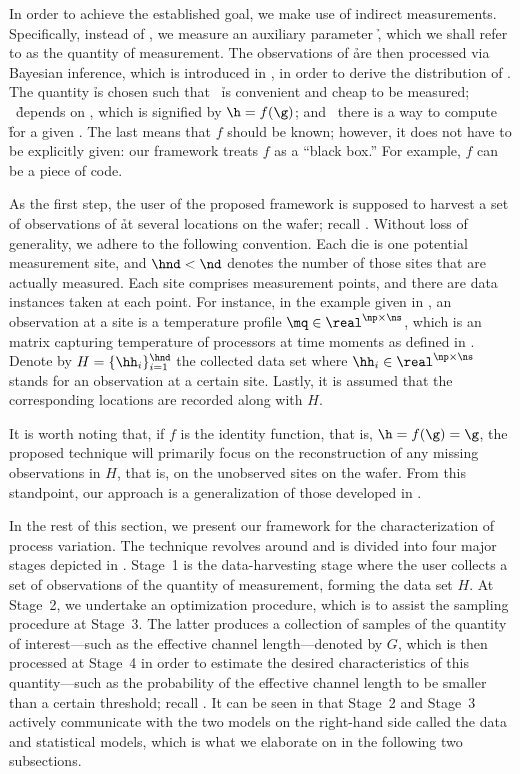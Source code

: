 In order to achieve the established goal, we make use of indirect measurements.
Specifically, instead of \g, we measure an auxiliary parameter \h, which we
shall refer to as the quantity of measurement. The observations of \h are then
processed via Bayesian inference, which is introduced in
, in order to derive the distribution of \g. The
quantity \h is chosen such that \one~\h is convenient and cheap to be measured;
\two~\h depends on \g, which is signified by $\h = f(\g)$; and \three~there is a
way to compute \h for a given \g. The last means that $f$ should be known;
however, it does not have to be explicitly given: our framework treats $f$ as a
``black box.'' For example, $f$ can be a piece of code.

As the first step, the user of the proposed framework is supposed to harvest a
set of observations of \h at several locations on the wafer; recall
. Without loss of generality, we adhere to the following
convention. Each die is one potential measurement site, and $\hnd < \nd$ denotes
the number of those sites that are actually measured. Each site comprises \np
measurement points, and there are \ns data instances taken at each point. For
instance, in the example given in , an observation at a
site is a temperature profile $\mq \in \real^{\np \times \ns}$, which is an
matrix capturing temperature of \np processors at \ns time moments as defined in
. Denote by $H = \{ \hh_i \}_{i = 1}^{\hnd}$ the
collected data set where $\hh_i \in \real^{\np \times \ns}$ stands for an
observation at a certain site. Lastly, it is assumed that the corresponding
locations are recorded along with $H$.

It is worth noting that, if $f$ is the identity function, that is, $\h = f(\g) =
\g$, the proposed technique will primarily focus on the reconstruction of any
missing observations in $H$, that is, on the unobserved sites on the wafer. From
this standpoint, our approach is a generalization of those developed in
\cite{zhang2010, reda2009}.

In the rest of this section, we present our framework for the characterization
of process variation. The technique revolves around  and is
divided into four major stages depicted in . Stage~1 is
the data-harvesting stage where the user collects a set of observations of the
quantity of measurement, forming the data set $H$. At Stage~2, we undertake an
optimization procedure, which is to assist the sampling procedure at Stage~3.
The latter produces a collection of samples of the quantity of interest---such
as the effective channel length---denoted by $G$, which is then processed at
Stage~4 in order to estimate the desired characteristics of this quantity---such
as the probability of the effective channel length to be smaller than a certain
threshold; recall . It can be seen in
 that Stage~2 and Stage~3 actively communicate with the
two models on the right-hand side called the data and statistical models, which
is what we elaborate on in the following two subsections.

